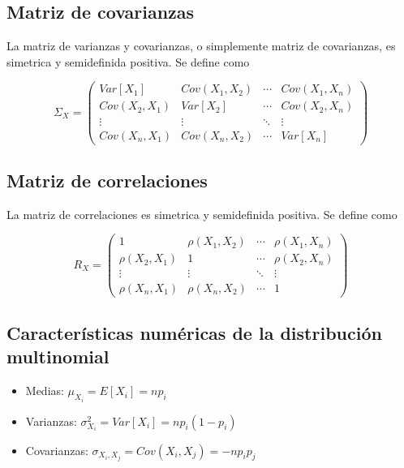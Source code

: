 \newpage

\subsection{Matriz de covarianzas}

La matriz de varianzas y covarianzas, o simplemente matriz de covarianzas, es simetrica y semidefinida positiva. Se define como

\[ \Sigma_{X} = \left( \begin{matrix}
        Var[X_1] & Cov(X_1, X_2) & \cdots & Cov(X_1, X_n) \\
        Cov(X_2, X_1) & Var[X_2] & \cdots & Cov(X_2, X_n) \\
        \vdots & \vdots & \ddots & \vdots \\
        Cov(X_n, X_1) & Cov(X_n, X_2) & \cdots & Var[X_n]
\end{matrix} \right) \]

\subsection{Matriz de correlaciones}

La matriz de correlaciones es simetrica y semidefinida positiva. Se define como

\[ R_{X} = \left( \begin{matrix}
        1 & \rho(X_1, X_2) & \cdots & \rho(X_1, X_n) \\
        \rho(X_2, X_1) & 1 & \cdots & \rho(X_2, X_n) \\
        \vdots & \vdots & \ddots & \vdots \\
        \rho(X_n, X_1) & \rho(X_n, X_2) & \cdots & 1
\end{matrix} \right) \]

\subsection{Características numéricas de la distribución multinomial}

\begin{itemize}
    \item Medias: $\mu_{X_i} = E[X_i] = np_i$
    \item Varianzas: $\sigma_{X_i}^2 = Var[X_i] = np_i(1 - p_i)$
    \item Covarianzas: $\sigma_{X_i, X_j} = Cov(X_i, X_j) = -np_ip_j$
\end{itemize}
